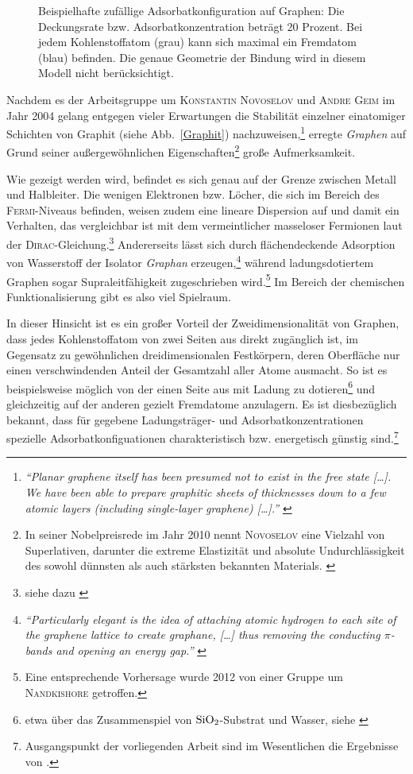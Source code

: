 \documentclass[a4paper, 10pt, twoside, openany]{book} %
\begin{document}
\begin{figure}[t]
\begin{minipage}[b]{0.5\textwidth}
        \caption[Beispielhafte zufällige Adsorbatkonfiguration auf Graphen]{Beispielhafte zufällige Adsorbatkonfiguration auf Graphen: Die Deckungsrate bzw. Adsorbatkonzentration beträgt 20 Prozent. Bei jedem Kohlenstoffatom (grau) kann sich maximal ein Fremdatom (blau) befinden. Die genaue Geometrie der Bindung wird in diesem Modell nicht berücksichtigt.}
        \label{random20}
    \end{minipage}
\end{figure}
%
Nachdem es der Arbeitsgruppe um \textsc{Konstantin Novoselov} und \textsc{Andre Geim} im Jahr 2004 gelang entgegen vieler Erwartungen die Stabilität einzelner einatomiger Schichten von Graphit (siehe Abb.~\ref{Graphit}) nachzuweisen,\footnote{\emph{"`Planar graphene itself has been presumed not to exist in the free state \emph{[\dots]}. We have been able to prepare graphitic sheets of thicknesses down to a few atomic layers (including single-layer graphene) \emph{[\dots]}."'} \cite[S.~666f]{Novoselov1}} erregte \emph{Graphen} auf Grund seiner außergewöhnlichen Eigenschaften\footnote{In seiner Nobelpreisrede im Jahr 2010 nennt \textsc{Novoselov} eine Vielzahl von Superlativen, darunter die extreme Elastizität und absolute Undurchlässigkeit des sowohl dünnsten als auch stärksten bekannten Materials. \cite[S.~107]{Novoselov2}} große Aufmerksamkeit.

Wie gezeigt werden wird, befindet es sich genau auf der Grenze zwischen Metall und Halbleiter. Die wenigen Elektronen bzw. Löcher, die sich im Bereich des \textsc{Fermi}-Niveaus befinden, weisen zudem eine lineare Dispersion auf und damit ein Verhalten, das vergleichbar ist mit dem vermeintlicher masseloser Fermionen laut der \textsc{Dirac}-Gleichung.\footnote{siehe dazu \cite[Abschnitt III]{Katsnelson2}} Andererseits lässt sich durch flächendeckende Adsorption von Wasserstoff der Isolator \emph{Graphan} erzeugen,\footnote{\emph{"`Particularly elegant is the idea of attaching atomic hydrogen to each site of the graphene lattice to create graphane, \emph{[\dots]} thus removing the conducting $\pi$-bands and opening an energy gap."'} \cite[S.~610]{Elias}} während ladungsdotiertem Graphen sogar Supraleitfähigkeit zugeschrieben wird.\footnote{Eine entsprechende Vorhersage wurde 2012 von einer Gruppe um \textsc{Nandkishore} \cite{Nandkishore} getroffen.} Im Bereich der chemischen Funktionalisierung gibt es also viel Spielraum.

In dieser Hinsicht ist es ein großer Vorteil der Zweidimensionalität von Graphen, dass jedes Kohlenstoffatom von zwei Seiten aus direkt zugänglich ist, im Gegensatz zu gewöhnlichen dreidimensionalen Festkörpern, deren Oberfläche nur einen verschwindenden Anteil der Gesamtzahl aller Atome ausmacht. So ist es beispielsweise möglich von der einen Seite aus mit Ladung zu dotieren\footnote{etwa über das Zusammenspiel von $\rm SiO_2$-Substrat und Wasser, siehe \cite{Wehling1}} und gleichzeitig auf der anderen gezielt Fremdatome anzulagern. Es ist diesbezüglich bekannt, dass für gegebene Ladungsträger- und Adsorbatkonzentrationen spezielle Adsorbatkonfiguationen charakteristisch bzw. energetisch günstig sind.\footnote{Ausgangspunkt der vorliegenden Arbeit sind im Wesentlichen die Ergebnisse von \cite{Wehling2}.}
\end{document}
